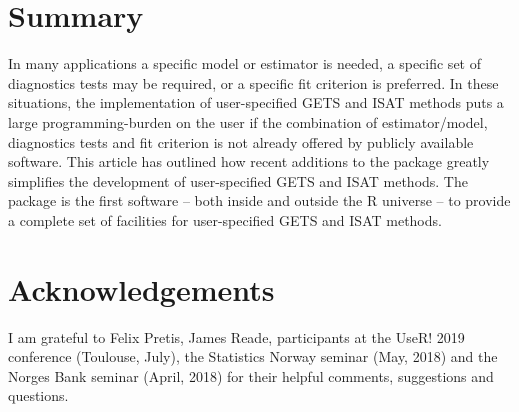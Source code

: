 \section{Summary}

In many applications a specific model or estimator is needed, a specific set of diagnostics tests may be required, or a specific fit criterion is preferred. In these situations, the implementation of user-specified GETS and ISAT methods puts a large programming-burden on the user if the combination of estimator/model, diagnostics tests and fit criterion is not already offered by publicly available software. This article has outlined how recent additions to the package  greatly simplifies the development of user-specified GETS and ISAT methods. The package is the first software -- both inside and outside the R universe -- to provide a complete set of facilities for user-specified GETS and ISAT methods.

\section{Acknowledgements}

I am grateful to Felix Pretis, James Reade, participants at the UseR! 2019 conference (Toulouse, July), the Statistics Norway seminar (May, 2018) and the Norges Bank seminar (April, 2018) for their helpful comments, suggestions and questions.



\address{Genaro Sucarrat\\
  BI Norwegian Business School\\
  Nydalsveien 37, 0484 Oslo\\
  Norway\\
  }
